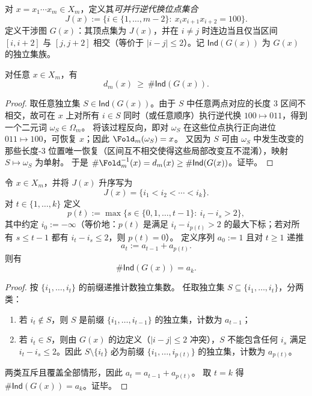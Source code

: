 \begin{definition}[可并行逆代换位点与干涉图]\label{def:pom-carry-interference-graph}
对 $x=x_1\cdots x_m\in X_m$，定义其\emph{可并行逆代换位点集合}
\[
J(x):=\{i\in\{1,\dots,m-2\}:\ x_ix_{i+1}x_{i+2}=100\}.
\]
定义干涉图 $G(x)$：其顶点集为 $J(x)$，并在 $i\neq j$ 时连边当且仅当区间 $[i,i+2]$ 与 $[j,j+2]$ 相交（等价于 $|i-j|\le 2$）。记 $\mathsf{Ind}(G(x))$ 为 $G(x)$ 的独立集族。
\end{definition}

\begin{lemma}[自由逆代换给出的纤维下界]\label{lem:pom-fiber-lower-bound-independent-sets}
对任意 $x\in X_m$，有
\[
d_m(x)\ \ge\ \#\mathsf{Ind}(G(x)).
\]
\end{lemma}

\begin{proof}
取任意独立集 $S\in\mathsf{Ind}(G(x))$。由于 $S$ 中任意两点对应的长度 $3$ 区间不相交，故可在 $x$ 上对所有 $i\in S$ 同时（或任意顺序）执行逆代换 $100\mapsto 011$，得到一个二元词 $\omega_S\in\Omega_m$。
将该过程反向，即对 $\omega_S$ 在这些位点执行正向进位 $011\mapsto 100$，可恢复 $x$；因此 $\Fold_m(\omega_S)=x$。
又因为 $S$ 可由 $\omega_S$ 中发生改变的那些长度-$3$ 位置唯一恢复（区间互不相交使得这些局部改变互不混淆），映射 $S\mapsto \omega_S$ 为单射。
于是 $\#\Fold_m^{-1}(x)=d_m(x)\ge \#\mathsf{Ind}(G(x))$。证毕。
\end{proof}

\begin{lemma}[独立集计数的线性时间递推（半径 2 冲突）]\label{lem:pom-independence-dp-radius2}
令 $x\in X_m$，并将 $J(x)$ 升序写为
\[
J(x)=\{i_1<i_2<\cdots<i_k\}.
\]
对 $t\in\{1,\dots,k\}$ 定义
\[
p(t):=\max\{s\in\{0,1,\dots,t-1\}:\ i_t-i_s>2\},
\]
其中约定 $i_0:=-\infty$（等价地：$p(t)$ 是满足 $i_t-i_{p(t)}>2$ 的最大下标；若对所有 $s\le t-1$ 都有 $i_t-i_s\le 2$，则 $p(t)=0$）。
定义序列 $a_0:=1$ 且对 $t\ge 1$ 递推
\[
a_t:=a_{t-1}+a_{p(t)}.
\]
则有
\[
\#\mathsf{Ind}(G(x))=a_k.
\]
\end{lemma}

\begin{proof}
按 $\{i_1,\dots,i_t\}$ 的前缀递推计数独立集数。
任取独立集 $S\subseteq\{i_1,\dots,i_t\}$，分两类：
\begin{enumerate}
  \item 若 $i_t\notin S$，则 $S$ 是前缀 $\{i_1,\dots,i_{t-1}\}$ 的独立集，计数为 $a_{t-1}$；
  \item 若 $i_t\in S$，则由 $G(x)$ 的边定义（$|i-j|\le 2$ 冲突），$S$ 不能包含任何 $i_s$ 满足 $i_t-i_s\le 2$。因此 $S\setminus\{i_t\}$ 必为前缀 $\{i_1,\dots,i_{p(t)}\}$ 的独立集，计数为 $a_{p(t)}$。
\end{enumerate}
两类互斥且覆盖全部情形，因此 $a_t=a_{t-1}+a_{p(t)}$。
取 $t=k$ 得 $\#\mathsf{Ind}(G(x))=a_k$。证毕。
\end{proof}


